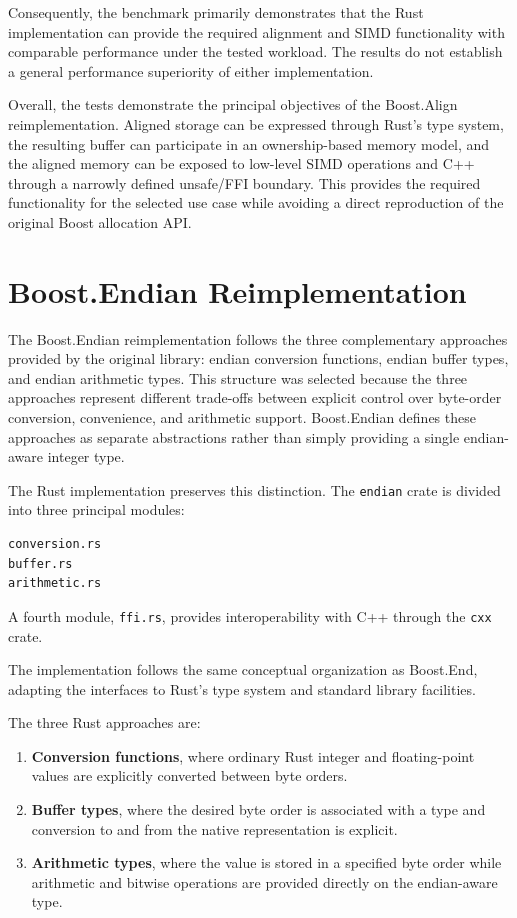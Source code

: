 Consequently, the benchmark primarily demonstrates that the Rust implementation can provide the required alignment and 
SIMD functionality with comparable performance under the tested workload.
The results do not establish a general performance superiority of either implementation.

Overall, the tests demonstrate the principal objectives of the Boost.Align reimplementation. 
Aligned storage can be expressed through Rust's type system, the resulting buffer can participate in an
ownership-based memory model, and the aligned memory can be exposed to low-level SIMD operations and C++ through a 
narrowly defined unsafe/FFI boundary. This provides the required functionality for the
selected use case while avoiding a direct reproduction of the original Boost allocation API.


\section{Boost.Endian Reimplementation}

The Boost.Endian reimplementation follows the three complementary approaches provided by the original library:
endian conversion functions, endian buffer types, and endian arithmetic types. 
This structure was selected because the three approaches represent different trade-offs between explicit 
control over byte-order conversion, convenience, and arithmetic support. 
Boost.Endian defines these approaches as separate abstractions rather than simply providing a single endian-aware 
integer type.

The Rust implementation preserves this distinction. The \texttt{endian} crate is divided into three principal modules:

\begin{lstlisting}[style=rustblock]
conversion.rs
buffer.rs
arithmetic.rs
\end{lstlisting}

A fourth module, \texttt{ffi.rs}, provides interoperability with C++ through the \texttt{cxx} crate.

The implementation follows the same conceptual organization as Boost.End, adapting the interfaces to Rust's type system
and standard library facilities.

The three Rust approaches are:

\begin{enumerate}
\item \textbf{Conversion functions}, where ordinary Rust integer and floating-point values are explicitly 
converted between byte orders.
\item \textbf{Buffer types}, where the desired byte order is associated with a type and conversion to and 
from the native representation is explicit.
\item \textbf{Arithmetic types}, where the value is stored in a specified byte order while arithmetic and 
bitwise operations are provided directly on the endian-aware type.
\end{enumerate}

